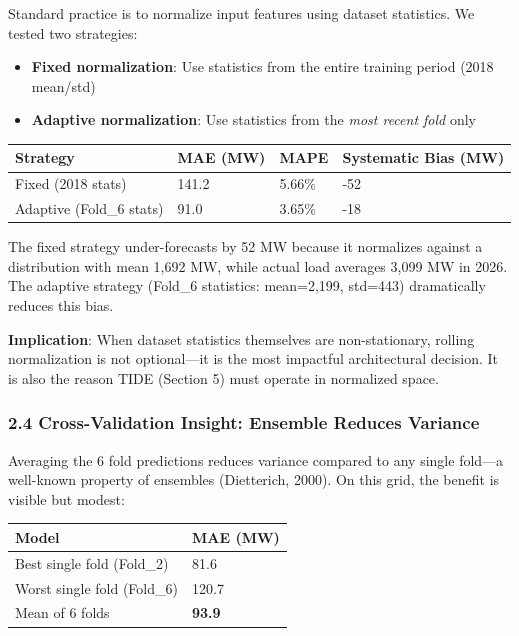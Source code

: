 Standard practice is to normalize input features using dataset
statistics. We tested two strategies:

\begin{itemize}
\tightlist
\item
  \textbf{Fixed normalization}: Use statistics from the entire training
  period (2018 mean/std)
\item
  \textbf{Adaptive normalization}: Use statistics from the \emph{most
  recent fold} only
\end{itemize}

{\def\LTcaptype{none} %
\begin{longtable}[]{@{}llll@{}}
\toprule\noalign{}
Strategy & MAE (MW) & MAPE & Systematic Bias (MW) \\
\midrule\noalign{}
\endhead
\bottomrule\noalign{}
\endlastfoot
Fixed (2018 stats) & 141.2 & 5.66\% & -52 \\
Adaptive (Fold\_6 stats) & 91.0 & 3.65\% & -18 \\
\end{longtable}
}

The fixed strategy under-forecasts by 52 MW because it normalizes
against a distribution with mean 1,692 MW, while actual load averages
3,099 MW in 2026. The adaptive strategy (Fold\_6 statistics: mean=2,199,
std=443) dramatically reduces this bias.

\textbf{Implication}: When dataset statistics themselves are
non-stationary, rolling normalization is not optional---it is the most
impactful architectural decision. It is also the reason TIDE (Section 5)
must operate in normalized space.

\subsubsection{2.4 Cross-Validation Insight: Ensemble Reduces
Variance}\label{cross-validation-insight-ensemble-reduces-variance}

Averaging the 6 fold predictions reduces variance compared to any single
fold---a well-known property of ensembles (Dietterich, 2000). On this
grid, the benefit is visible but modest:

{\def\LTcaptype{none} %
\begin{longtable}[]{@{}ll@{}}
\toprule\noalign{}
Model & MAE (MW) \\
\midrule\noalign{}
\endhead
\bottomrule\noalign{}
\endlastfoot
Best single fold (Fold\_2) & 81.6 \\
Worst single fold (Fold\_6) & 120.7 \\
Mean of 6 folds & \textbf{93.9} \\
\end{longtable}
}

